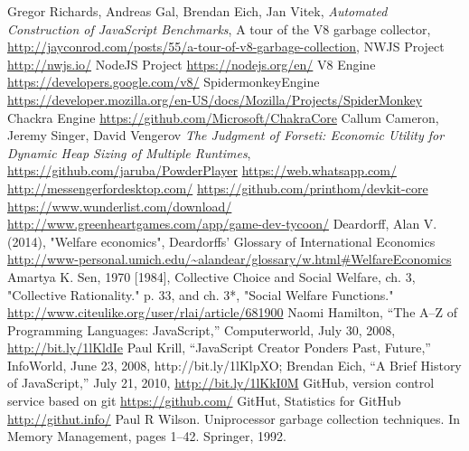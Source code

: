 \documentclass{l4proj}
\begin{document}
\begin{thebibliography}{9}
Gregor Richards, Andreas Gal, Brendan Eich, Jan Vitek,
\emph{Automated Construction of JavaScript Benchmarks},
A tour of the V8 garbage collector,
\url{http://jayconrod.com/posts/55/a-tour-of-v8-garbage-collection},
NWJS Project
\url{http://nwjs.io/}
NodeJS Project
\url{https://nodejs.org/en/}
V8 Engine
\url{https://developers.google.com/v8/}
SpidermonkeyEngine
\url{https://developer.mozilla.org/en-US/docs/Mozilla/Projects/SpiderMonkey}
Chackra Engine
\url{https://github.com/Microsoft/ChakraCore}
Callum Cameron, Jeremy Singer, David Vengerov
\emph{The Judgment of Forseti: Economic Utility for Dynamic Heap Sizing of Multiple Runtimes},
\url{https://github.com/jaruba/PowderPlayer}
\url{https://web.whatsapp.com/}
\url{http://messengerfordesktop.com/}
\url{https://github.com/printhom/devkit-core}
\url{https://www.wunderlist.com/download/}
\url{http://www.greenheartgames.com/app/game-dev-tycoon/}
Deardorff, Alan V. (2014), "Welfare economics", Deardorffs' Glossary of International Economics \url{http://www-personal.umich.edu/~alandear/glossary/w.html#WelfareEconomics}
Amartya K. Sen, 1970 [1984], Collective Choice and Social Welfare, ch. 3, "Collective Rationality." p. 33, and ch. 3*, "Social Welfare Functions." \url{http://www.citeulike.org/user/rlai/article/681900}
Naomi Hamilton, “The A–Z of Programming Languages: JavaScript,” Computerworld, July 30, 2008, \url{http://bit.ly/1lKldIe}
 Paul Krill, “JavaScript Creator Ponders Past, Future,” InfoWorld, June 23, 2008, http://bit.ly/1lKlpXO; Brendan Eich, “A Brief History of JavaScript,” July 21, 2010, \url{http://bit.ly/1lKkI0M}
GitHub, version control service based on git \hspace*{1em} \url{https://github.com/}
GitHut, Statistics for GitHub \hspace*{1em} \url{http://githut.info/}
Paul R Wilson. Uniprocessor garbage collection techniques. In Memory Management, pages 1–42.
Springer, 1992.
\end{thebibliography}
\end{document}
